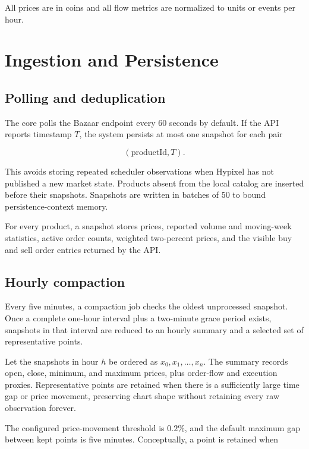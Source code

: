 \documentclass[11pt,a4paper]{article}
\begin{document}
All prices are in coins and all flow metrics are normalized to units or events per hour.

\section{Ingestion and Persistence}

\subsection{Polling and deduplication}

The core polls the Bazaar endpoint every 60 seconds by default. If the API reports timestamp
$T$, the system persists at most one snapshot for each pair

\begin{equation}
(\text{productId},T).
\end{equation}

This avoids storing repeated scheduler observations when Hypixel has not published a new
market state. Products absent from the local catalog are inserted before their snapshots.
Snapshots are written in batches of 50 to bound persistence-context memory.

For every product, a snapshot stores prices, reported volume and moving-week statistics,
active order counts, weighted two-percent prices, and the visible buy and sell order entries
returned by the API.

\subsection{Hourly compaction}

Every five minutes, a compaction job checks the oldest unprocessed snapshot. Once a complete
one-hour interval plus a two-minute grace period exists, snapshots in that interval are
reduced to an hourly summary and a selected set of representative points.

Let the snapshots in hour $h$ be ordered as $x_0,x_1,\ldots,x_n$. The summary records open,
close, minimum, and maximum prices, plus order-flow and execution proxies. Representative
points are retained when there is a sufficiently large time gap or price movement, preserving
chart shape without retaining every raw observation forever.

The configured price-movement threshold is $0.2\%$, and the default maximum gap between kept
points is five minutes. Conceptually, a point is retained when
\end{document}
